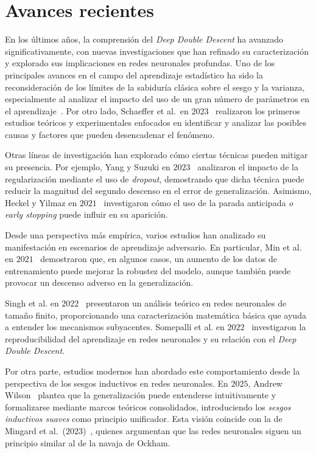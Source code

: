 \section{Avances recientes}\label{}

En los últimos años, la comprensión del \textit{Deep Double Descent} ha avanzado significativamente, con nuevas investigaciones que han refinado su caracterización y explorado sus implicaciones en redes neuronales profundas. Uno de los principales avances en el campo del aprendizaje estadístico ha sido la reconsideración de los límites de la sabiduría clásica sobre el sesgo y la varianza, especialmente al analizar el impacto del uso de un gran número de parámetros en el aprendizaje~\cite{Zhang2021,Curth2023}. Por otro lado, Schaeffer et al.\ en $2023$~\cite{Schaeffer2023} realizaron los primeros estudios teóricos y experimentales enfocados en identificar y analizar las posibles causas y factores que pueden desencadenar el fenómeno.\newline

Otras líneas de investigación han explorado cómo ciertas técnicas pueden mitigar su presencia. Por ejemplo, Yang y Suzuki en $2023$~\cite{Yang2024} analizaron el impacto de la regularización mediante el uso de \textit{dropout}, demostrando que dicha técnica puede reducir la magnitud del segundo descenso en el error de generalización. Asimismo, Heckel y Yilmaz en $2021$~\cite{Heckel2020} investigaron cómo el uso de la parada anticipada \emph{o early stopping} puede influir en su aparición.\newline

Desde una perspectiva más empírica, varios estudios han analizado su manifestación en escenarios de aprendizaje adversario. En particular, Min et al. en $2021$~\cite{Ming2020} demostraron que, en algunos casos, un aumento de los datos de entrenamiento puede mejorar la robustez del modelo, aunque también puede provocar un descenso adverso en la generalización.\newline

Singh et al. en $2022$~\cite{Singh2022} presentaron un análisis teórico en redes neuronales de tamaño finito, proporcionando una caracterización matemática básica que ayuda a entender los mecanismos subyacentes. Somepalli et al. en $2022$~\cite{Somepalli2022} investigaron la reproducibilidad del aprendizaje en redes neuronales y su relación con el \textit{Deep Double Descent}.\newline

Por otra parte, estudios modernos han abordado este comportamiento desde la perspectiva de los sesgos inductivos en redes neuronales. En $2025$, Andrew Wilson~\cite{Wilson2025} plantea que la generalización puede entenderse intuitivamente y formalizarse mediante marcos teóricos consolidados, introduciendo los \textit{sesgos inductivos suaves} como principio unificador. Esta visión coincide con la de Mingard et al.\ ($2023$)~\cite{Mingard2023}, quienes argumentan que las redes neuronales siguen un principio similar al de la navaja de Ockham.\newline

